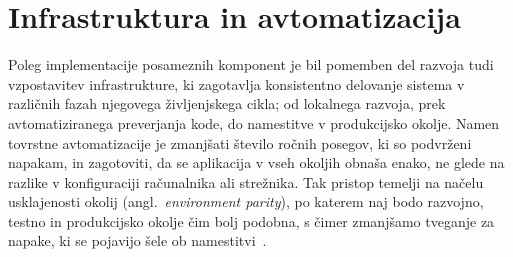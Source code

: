 \documentclass[a4paper,12pt,openright]{book}
\begin{document}
\section{Infrastruktura in avtomatizacija}
Poleg implementacije posameznih komponent je bil pomemben del
razvoja tudi vzpostavitev infrastrukture, ki zagotavlja konsistentno delovanje
sistema v različnih fazah njegovega življenjskega cikla; od lokalnega razvoja,
prek avtomatiziranega preverjanja kode, do namestitve v produkcijsko okolje.
Namen tovrstne avtomatizacije je zmanjšati število ročnih posegov, ki so
podvrženi napakam, in zagotoviti, da se aplikacija v vseh okoljih obnaša enako,
ne glede na razlike v konfiguraciji računalnika ali
strežnika. Tak pristop temelji na načelu usklajenosti
okolij (angl.\ \emph{environment parity}), po katerem naj bodo razvojno, testno
in produkcijsko okolje čim bolj podobna, s čimer zmanjšamo tveganje za napake, ki se
pojavijo šele ob namestitvi~\cite{twelve-factor}.
\end{document}
